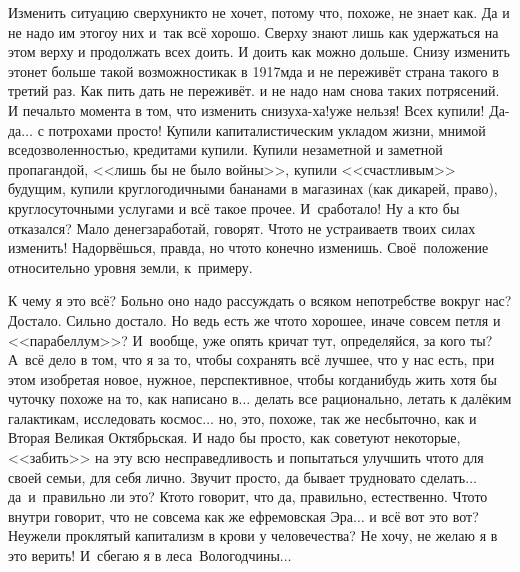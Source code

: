 Изменить ситуацию сверху\mdash никто не хочет, потому что, похоже, не знает как. Да и не надо им этого\mdash у них и~так всё хорошо. Сверху знают лишь как удержаться на этом верху и продолжать всех доить. И доить как можно дольше. Снизу изменить это\mdash нет больше такой возможности\mdash как в 1917\sdash м\mdash да и не переживёт страна такого в третий раз. Как пить дать не переживёт. и не надо нам снова таких потрясений. И печаль\sdash то момента в том, что изменить снизу\mdash ха-ха!\mdash уже нельзя! Всех купили! Да-да$\ldots$ с потрохами просто! Купили капиталистическим укладом жизни, мнимой вседозволенностью, кредитами купили. Купили незаметной и заметной пропагандой, <<лишь бы не было войны>>, купили <<счастливым>> будущим, купили круглогодичными бананами в магазинах (как дикарей, право), круглосуточными услугами и всё такое прочее. И~сработало! Ну а кто бы отказался? Мало денег\mdash заработай, говорят. Что\sdash то не устраивает\mdash в твоих силах изменить! Надорвёшься, правда, но что\sdash то конечно изменишь. Своё~положение относительно уровня земли, к~примеру.

К чему я это всё? Больно оно надо рассуждать о всяком непотребстве вокруг нас? Достало. Сильно достало. Но ведь есть же что\sdash то хорошее, иначе совсем петля и <<парабеллум>>? И~вообще, уже опять кричат тут, определяйся, за кого ты? А~всё дело в том, что я за то, чтобы сохранять всё лучшее, что у нас есть, при этом изобретая новое, нужное, перспективное, чтобы когда\sdash нибудь жить хотя бы чуточку похоже на то, как написано в\cite{ТуманностьАндромеды}$\ldots$ делать все рационально, летать к далёким галактикам, исследовать космос$\ldots$ но, это, похоже, так же несбыточно, как и Вторая Великая Октябрьская. И надо бы просто, как советуют некоторые, <<забить>> на эту всю несправедливость и попытаться улучшить что\sdash то для своей семьи, для себя лично. Звучит просто, да бывает трудновато сделать$\ldots$ да~и~правильно ли это? Кто\sdash то говорит, что да, правильно, естественно. Что\sdash то внутри говорит, что не совсем\mdash а как же ефремовская Эра$\ldots$ и всё вот это вот? Неужели проклятый капитализм в крови у человечества? Не хочу, не желаю я в это верить! И~сбегаю я в леса~Вологодчины$\ldots$ 

